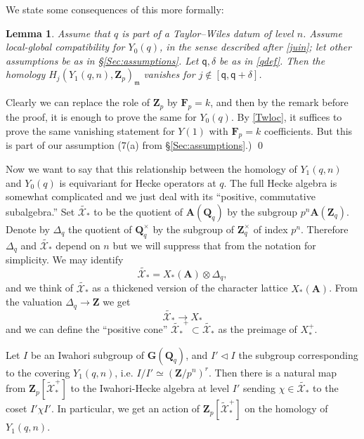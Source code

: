 \documentclass[10pt]{amsart}
\newcommand{\Z}{\mathbf{Z}}
\newcommand{\Q}{\mathbf{Q}}
\newcommand{\G}{\mathbf{G}}
\newtheorem{lemma}[subsection]{Lemma}
\theoremstyle{remark}
\newcommand{\BWq}{\mathsf{q}}
\begin{document}
    We state  some consequences of this more formally:
   
   \begin{lemma}  \label{vanishing lemma BW} Assume that $q$ is part of a Taylor--Wiles datum of level $n$. 
   Assume local-global compatibility for $Y_0(q)$, in the sense described after \eqref{juin};
   let other assumptions be as in  \S \ref{Sec:assumptions}.
   Let  $\BWq,\delta$ be as in   \eqref{qdef}.  
   Then the homology $H_j(Y_1(q,n), \Z_p)_{\mathfrak{m}}$
  vanishes for $j \notin [\BWq, \BWq+\delta]$.   \end{lemma} 
 
\proof
Clearly we can replace the role of $\Z_p$ by $\mathbf{F}_p = k$, and then 
by the remark before the proof, it is enough to prove the same for  $Y_0(q)$.  
By \eqref{Twloc}, it suffices to prove the same vanishing statement for $Y(1)$
with $\mathbf{F}_p = k$ coefficients.  But this is part of our assumption (7(a) from 
 \S \ref{Sec:assumptions}.) \qed

 

   Now  we want to say that this relationship between the homology of $Y_1(q, n)$ and $Y_0(q)$ is equivariant
   for Hecke operators at $q$.  The full Hecke algebra is somewhat complicated and we just deal with its ``positive, commutative subalgebra.''  
 Set $\widetilde{\mathcal{X}_*}$ to be the quotient of $\mathbf{A}(\Q_{q})$
   by the subgroup  $p^n \mathbf{A}(\Z_{q})$.       Denote by $\Delta_{q}$ the quotient of $\Q_{q}^{\times}$ by the subgroup of $\Z_{q}^{\times}$ of index $p^n$. Therefore $\Delta_{q}$ and  $\widetilde{\mathcal{X}_*}$ depend on $n$ but we will suppress that from the notation for simplicity.  We may identify
      $$\widetilde{\mathcal{X}_*} = X_*(\mathbf{A}) \otimes \Delta_{q},$$
      and we think of $\widetilde{\mathcal{X}_*}$ as a thickened version of the character lattice $X_*(\mathbf{A})$.  
 From the valuation $\Delta_{q} \rightarrow \Z$ we get
\begin{equation} \label{reduction} \widetilde{\mathcal{X}_*} \rightarrow  X_* \end{equation}
and we can define the ``positive cone'' $\widetilde{\mathcal{X}_*} ^+  \subset \widetilde{\mathcal{X}_*}$ as the preimage of $X_*^+$. 


Let   $I$ be an Iwahori subgroup of $\G(\Q_q)$, and $I' \vartriangleleft I$
 the subgroup corresponding to the covering $Y_1(q, n)$, i.e. $I/I' \simeq (\Z/p^n)^r$. 
Then there is a natural map from $\Z_p[\widetilde{\mathcal{X}}_*^+]$  
to the Iwahori-Hecke algebra  at level $I'$ 
sending $\chi \in \widetilde{\mathcal{X}_*}$ to the coset $I'  \chi   I'$. 
In particular, we get an action of $\Z_p[\widetilde{\mathcal{X}}_*^+]$
on the homology of $Y_1(q, n)$.  
\end{document}
